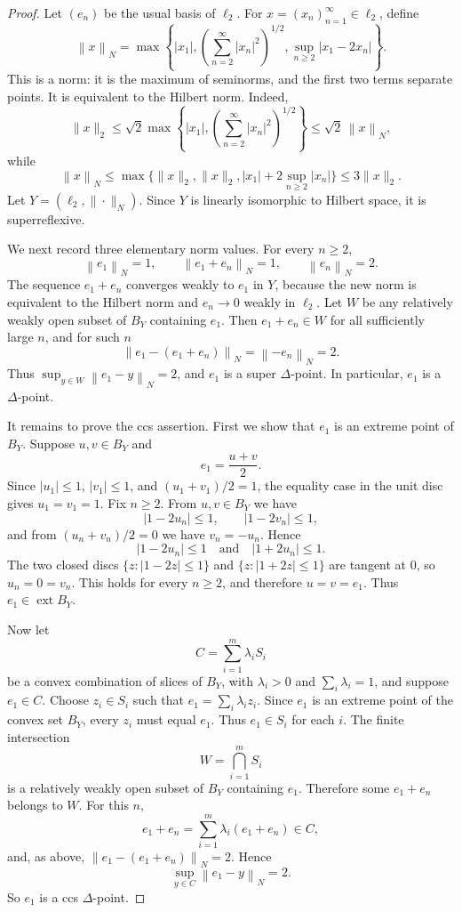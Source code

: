 \documentclass[11pt]{article}
\newcommand{\ellTwo}{\ell_2}
\newcommand{\normN}[1]{\left\|#1\right\|_N}
\begin{document}
\begin{proof}
Let \((e_n)\) be the usual basis of \(\ellTwo\).  For
\(x=(x_n)_{n=1}^{\infty}\in\ellTwo\), define
\[
  \normN{x}
  =
  \max\left\{
    |x_1|,
    \left(\sum_{n=2}^{\infty}|x_n|^2\right)^{1/2},
    \sup_{n\ge 2}|x_1-2x_n|
  \right\}.
\]
This is a norm: it is the maximum of seminorms, and the first two terms
separate points.  It is equivalent to the Hilbert norm.  Indeed,
\[
  \|x\|_2
  \le \sqrt 2\max\left\{|x_1|,
    \left(\sum_{n=2}^{\infty}|x_n|^2\right)^{1/2}\right\}
  \le \sqrt 2\,\normN{x},
\]
while
\[
  \normN{x}
  \le \max\{\|x\|_2,\|x\|_2, |x_1|+2\sup_{n\ge2}|x_n|\}
  \le 3\|x\|_2.
\]
Let \(Y=(\ellTwo,\|\cdot\|_N)\).  Since \(Y\) is linearly isomorphic to
Hilbert space, it is superreflexive.

We next record three elementary norm values.  For every \(n\ge2\),
\[
  \normN{e_1}=1,\qquad
  \normN{e_1+e_n}=1,\qquad
  \normN{e_n}=2.
\]
The sequence \(e_1+e_n\) converges weakly to \(e_1\) in \(Y\), because the new
norm is equivalent to the Hilbert norm and \(e_n\to0\) weakly in \(\ell_2\).
Let \(W\) be any relatively weakly open subset of \(B_Y\) containing \(e_1\).
Then \(e_1+e_n\in W\) for all sufficiently large \(n\), and for such \(n\)
\[
  \normN{e_1-(e_1+e_n)}
  =
  \normN{-e_n}
  =
  2.
\]
Thus \(\sup_{y\in W}\normN{e_1-y}=2\), and \(e_1\) is a super
\(\Delta\)-point.  In particular, \(e_1\) is a \(\Delta\)-point.

It remains to prove the ccs assertion.  First we show that \(e_1\) is an
extreme point of \(B_Y\).  Suppose \(u,v\in B_Y\) and
\[
  e_1=\frac{u+v}{2}.
\]
Since \(|u_1|\le1\), \(|v_1|\le1\), and \((u_1+v_1)/2=1\), the equality case
in the unit disc gives \(u_1=v_1=1\).  Fix \(n\ge2\).  From \(u,v\in B_Y\)
we have
\[
  |1-2u_n|\le1,\qquad |1-2v_n|\le1,
\]
and from \((u_n+v_n)/2=0\) we have \(v_n=-u_n\).  Hence
\[
  |1-2u_n|\le1
  \quad\text{and}\quad
  |1+2u_n|\le1.
\]
The two closed discs \(\{z:|1-2z|\le1\}\) and
\(\{z:|1+2z|\le1\}\) are tangent at \(0\), so \(u_n=0=v_n\).  This holds
for every \(n\ge2\), and therefore \(u=v=e_1\).  Thus \(e_1\in\operatorname
{ext} B_Y\).

Now let
\[
  C=\sum_{i=1}^m\lambda_i S_i
\]
be a convex combination of slices of \(B_Y\), with \(\lambda_i>0\) and
\(\sum_i\lambda_i=1\), and suppose \(e_1\in C\).  Choose
\(z_i\in S_i\) such that \(e_1=\sum_i\lambda_i z_i\).  Since \(e_1\) is an
extreme point of the convex set \(B_Y\), every \(z_i\) must equal \(e_1\).
Thus \(e_1\in S_i\) for each \(i\).  The finite intersection
\[
  W=\bigcap_{i=1}^m S_i
\]
is a relatively weakly open subset of \(B_Y\) containing \(e_1\).  Therefore
some \(e_1+e_n\) belongs to \(W\).  For this \(n\),
\[
  e_1+e_n=\sum_{i=1}^m\lambda_i(e_1+e_n)\in C,
\]
and, as above, \(\normN{e_1-(e_1+e_n)}=2\).  Hence
\[
  \sup_{y\in C}\normN{e_1-y}=2.
\]
So \(e_1\) is a ccs \(\Delta\)-point.
\end{proof}
\end{document}
